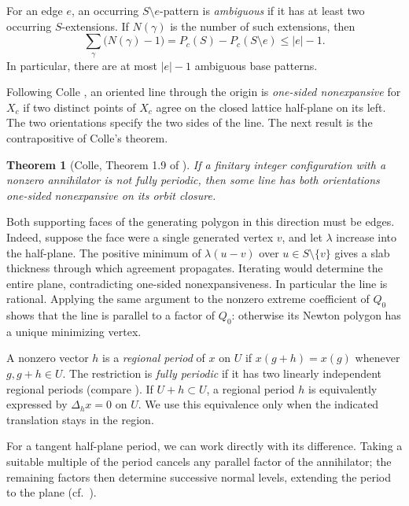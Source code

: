 \documentclass[11pt]{article}
\numberwithin{equation}{section}
\newtheorem{theorem}{Theorem}[section]
\theoremstyle{definition}
\theoremstyle{remark}
\newcommand{\Del}[1]{\Delta_{#1}}
\begin{document}
For an edge $e$, an occurring $S\setminus e$-pattern is \emph{ambiguous} if it has at least two
occurring $S$-extensions. If $N(\gamma)$ is the number of such extensions, then
\begin{equation}\label{eq:ambiguity-budget}
 \sum_{\gamma}\bigl(N(\gamma)-1\bigr)
 =P_c(S)-P_c(S\setminus e)\le |e|-1.
\end{equation}
In particular, there are at most $|e|-1$ ambiguous base patterns.

Following Colle \cite[Section~1]{Colle}, an oriented line through the origin is
\emph{one-sided nonexpansive} for $X_c$ if two distinct points of $X_c$ agree on the closed lattice
half-plane on its left. The two orientations specify the two sides of the line. The next result is
the contrapositive of Colle's theorem.

\begin{theorem}[Colle, Theorem 1.9 of \cite{Colle}]\label{thm:paired}
If a finitary integer configuration with a nonzero annihilator is not fully periodic, then some line
has both orientations one-sided nonexpansive on its orbit closure.
\end{theorem}

Both supporting faces of the generating polygon in this direction must be edges. Indeed, suppose the
face were a single generated vertex $v$, and let $\lambda$ increase into the half-plane. The
positive minimum of $\lambda(u-v)$ over $u\in S\setminus\{v\}$ gives a slab thickness through which
agreement propagates. Iterating would determine the entire plane, contradicting one-sided
nonexpansiveness. In particular the line is rational. Applying the same argument to the nonzero
extreme coefficient of $Q_0$ shows that the line is parallel to a factor of $Q_0$: otherwise its
Newton polygon has a unique minimizing vertex.

A nonzero vector $h$ is a \emph{regional period} of $x$ on $U$ if $x(g+h)=x(g)$ whenever $g,g+h\in
U$. The restriction is \emph{fully periodic} if it has two linearly independent regional periods
(compare \cite[Definition~2.12]{Colle}). If $U+h\subset U$, a regional period $h$ is equivalently
expressed by $\Del h x=0$ on $U$. We use this equivalence only when the indicated translation
stays in the region.

For a tangent half-plane period, we can work directly with its difference. Taking a suitable
multiple of the period cancels any parallel factor of the annihilator; the remaining factors then
determine successive normal levels, extending the period to the plane
(cf.~\cite[Proposition~2.14]{Colle}).
\end{document}
